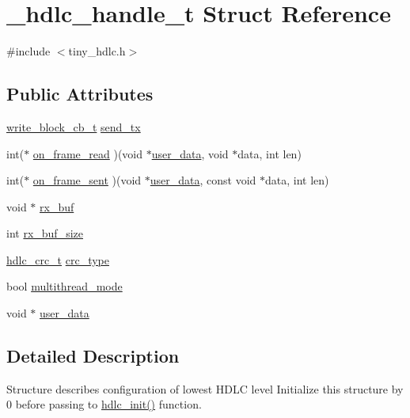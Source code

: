 \hypertarget{struct__hdlc__handle__t}{}\section{\+\_\+hdlc\+\_\+handle\+\_\+t Struct Reference}
\label{struct__hdlc__handle__t}


{\ttfamily \#include $<$tiny\+\_\+hdlc.\+h$>$}

\subsection*{Public Attributes}
\begin{DoxyCompactItemize}
\item 
\hyperlink{tiny__types_8h_aafd634660bba76cace57a8f9b01e044d}{write\+\_\+block\+\_\+cb\+\_\+t} \hyperlink{struct__hdlc__handle__t_a1b3432eda3d865c6edd355ff9e8d588c}{send\+\_\+tx}
\item 
int($\ast$ \hyperlink{struct__hdlc__handle__t_a751872adfef39b5b1325fa8826bae689}{on\+\_\+frame\+\_\+read} )(void $\ast$\hyperlink{struct__hdlc__handle__t_a41563ee7b01240a582d2f9ce9a632da8}{user\+\_\+data}, void $\ast$data, int len)
\item 
int($\ast$ \hyperlink{struct__hdlc__handle__t_a9aba360df83395af01ff448bca03e259}{on\+\_\+frame\+\_\+sent} )(void $\ast$\hyperlink{struct__hdlc__handle__t_a41563ee7b01240a582d2f9ce9a632da8}{user\+\_\+data}, const void $\ast$data, int len)
\item 
void $\ast$ \hyperlink{struct__hdlc__handle__t_a4736ab7a858df79cf74bd19e6dbacb13}{rx\+\_\+buf}
\item 
int \hyperlink{struct__hdlc__handle__t_a40baccf093b26c08d9108c8238f95675}{rx\+\_\+buf\+\_\+size}
\item 
\hyperlink{group__HDLC__API_gabb73b32d08d8e79eefe9385634a74bf7}{hdlc\+\_\+crc\+\_\+t} \hyperlink{struct__hdlc__handle__t_a156f67a5da24e537a8c0dcda28b59668}{crc\+\_\+type}
\item 
bool \hyperlink{struct__hdlc__handle__t_aa70c56a76a3c4c5d9ccdee3b019bbce7}{multithread\+\_\+mode}
\item 
void $\ast$ \hyperlink{struct__hdlc__handle__t_a41563ee7b01240a582d2f9ce9a632da8}{user\+\_\+data}
\end{DoxyCompactItemize}


\subsection{Detailed Description}
Structure describes configuration of lowest H\+D\+LC level Initialize this structure by 0 before passing to \hyperlink{group__HDLC__API_gaa41c388433273a76460ddfbaff0f8f5d}{hdlc\+\_\+init()} function. 


